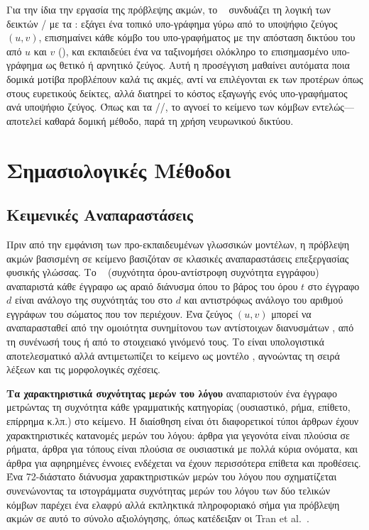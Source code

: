 Για την ίδια την εργασία της πρόβλεψης ακμών, το \textbf{}~\cite{zhangchen2018seal} συνδυάζει τη λογική των δεικτών / με τα
: εξάγει ένα τοπικό υπο-γράφημα γύρω από το υποψήφιο ζεύγος $(u, v)$,
επισημαίνει κάθε κόμβο του υπο-γραφήματος με την απόσταση δικτύου του από $u$ και $v$
(), και εκπαιδεύει ένα  να ταξινομήσει
ολόκληρο το επισημασμένο υπο-γράφημα ως θετικό ή αρνητικό ζεύγος.
Αυτή η προσέγγιση
μαθαίνει αυτόματα ποια δομικά μοτίβα προβλέπουν καλά τις ακμές, αντί να επιλέγονται
εκ των προτέρων όπως στους ευρετικούς δείκτες, αλλά διατηρεί το κόστος εξαγωγής ενός
υπο-γραφήματος ανά υποψήφιο ζεύγος.
Όπως και τα //, το  αγνοεί το κείμενο των
κόμβων εντελώς---αποτελεί καθαρά δομική μέθοδο, παρά τη χρήση νευρωνικού δικτύου.


\section{Σημασιολογικές Μέθοδοι}
\label{sec:semantic-methods}

\subsection{Κειμενικές Αναπαραστάσεις}
\label{subsec:text-representations}

Πριν από την εμφάνιση των προ-εκπαιδευμένων γλωσσικών μοντέλων, η πρόβλεψη ακμών
βασισμένη σε κείμενο βασιζόταν σε κλασικές αναπαραστάσεις επεξεργασίας φυσικής
γλώσσας.
Το \textbf{}~\cite{sparckjones1972statistical} (συχνότητα όρου-αντίστροφη συχνότητα εγγράφου)
αναπαριστά κάθε έγγραφο ως αραιό διάνυσμα όπου το βάρος του όρου $t$ στο έγγραφο
$d$ είναι ανάλογο της συχνότητάς του στο $d$ και αντιστρόφως ανάλογο του αριθμού
εγγράφων του σώματος που τον περιέχουν.
Ένα ζεύγος $(u, v)$ μπορεί να αναπαρασταθεί
από την ομοιότητα συνημίτονου των αντίστοιχων διανυσμάτων , από τη
συνένωσή τους ή από το στοιχειακό γινόμενό τους.
Το  είναι υπολογιστικά
αποτελεσματικό αλλά αντιμετωπίζει το κείμενο ως μοντέλο , αγνοώντας τη σειρά
λέξεων και τις μορφολογικές σχέσεις.

\textbf{Τα χαρακτηριστικά συχνότητας μερών του λόγου} αναπαριστούν ένα έγγραφο
μετρώντας τη συχνότητα κάθε γραμματικής κατηγορίας (ουσιαστικό, ρήμα, επίθετο,
επίρρημα κ.λπ.) στο κείμενο.
Η διαίσθηση είναι ότι διαφορετικοί τύποι άρθρων
 έχουν χαρακτηριστικές κατανομές μερών του λόγου: άρθρα για γεγονότα
είναι πλούσια σε ρήματα, άρθρα για τόπους είναι πλούσια σε ουσιαστικά με πολλά
κύρια ονόματα, και άρθρα για αφηρημένες έννοιες ενδέχεται να έχουν περισσότερα
επίθετα και προθέσεις.
Ένα 72-διάστατο διάνυσμα χαρακτηριστικών μερών του λόγου
που σχηματίζεται συνενώνοντας τα ιστογράμματα συχνότητας μερών του λόγου των δύο
τελικών κόμβων παρέχει ένα ελαφρύ αλλά εκπληκτικά πληροφοριακό σήμα για πρόβλεψη
ακμών σε αυτό το σύνολο αξιολόγησης, όπως κατέδειξαν οι Tran et al.~\cite{tran2023text}.

